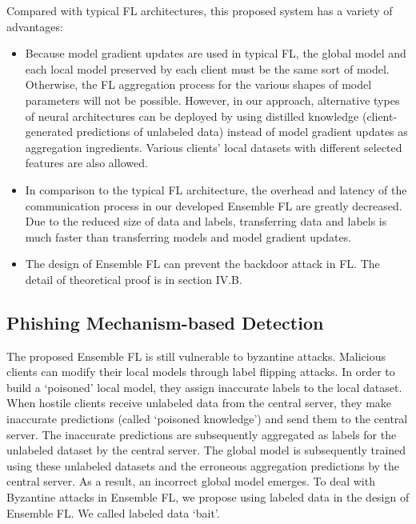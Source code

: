 \documentclass[journal]{IEEEtran}
\begin{document}
\par Compared with typical FL architectures, this proposed system has a variety of advantages:
\begin{itemize}

  \item Because model gradient updates are used in typical FL, the global model and each local model preserved by each client must be the same sort of model. Otherwise, the FL aggregation process for the various shapes of model parameters will not be possible. However, in our approach, alternative types of neural architectures can be deployed by using distilled knowledge (client-generated predictions of unlabeled data) instead of model gradient updates as aggregation ingredients. Various clients' local datasets with different selected features are also allowed.
  \item In comparison to the typical FL architecture, the overhead and latency of the communication process in our developed Ensemble FL are greatly decreased. Due to the reduced size of data and labels, transferring data and labels is much faster than transferring models and model gradient updates.
  \item The design of Ensemble FL can prevent the backdoor attack in FL. The detail of theoretical proof is in section IV.B.
\end{itemize}
      


\subsection{Phishing Mechanism-based Detection}
The proposed Ensemble FL is still vulnerable to byzantine attacks. Malicious clients can modify their local models through label flipping attacks. In order to build a `poisoned' local model, they assign inaccurate labels to the local dataset. When hostile clients receive unlabeled data from the central server, they make inaccurate predictions (called `poisoned knowledge') and send them to the central server. The inaccurate predictions are subsequently aggregated as labels for the unlabeled dataset by the central server. The global model is subsequently trained using these unlabeled datasets and the erroneous aggregation predictions by the central server. As a result, an incorrect global model emerges. To deal with Byzantine attacks in Ensemble FL, we propose using labeled data in the design of Ensemble FL. We called labeled data `bait'.
\end{document}
